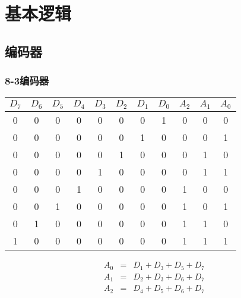 \documentclass[10pt]{book}
\begin{document}
\chapter{基本逻辑}
\section{编码器}
\subsection{8-3编码器}
\begin{tabular}{|c|c|c|c|c|c|c|c||c|c|c|}
\hline
$D_{7}$ & $D_{6}$ & $D_{5}$ & $D_{4}$ & $D_{3}$ & $D_{2}$ & $D_{1}$ & $D_{0}$ & $A_{2}$ & $A_{1}$ & $A_{0}$ \\
\hline
0 & 0 & 0 & 0 & 0 & 0 & 0 & 1 & 0 & 0 & 0 \\
0 & 0 & 0 & 0 & 0 & 0 & 1 & 0 & 0 & 0 & 1 \\
0 & 0 & 0 & 0 & 0 & 1 & 0 & 0 & 0 & 1 & 0 \\
0 & 0 & 0 & 0 & 1 & 0 & 0 & 0 & 0 & 1 & 1 \\
0 & 0 & 0 & 1 & 0 & 0 & 0 & 0 & 1 & 0 & 0 \\
0 & 0 & 1 & 0 & 0 & 0 & 0 & 0 & 1 & 0 & 1 \\
0 & 1 & 0 & 0 & 0 & 0 & 0 & 0 & 1 & 1 & 0 \\
1 & 0 & 0 & 0 & 0 & 0 & 0 & 0 & 1 & 1 & 1 \\
\hline
\end{tabular}

\begin{eqnarray}
A_{0} &=& D_{1}+D_{3}+D_{5}+D_{7} \\
A_{1} &=& D_{2}+D_{3}+D_{6}+D_{7} \\
A_{2} &=& D_{4}+D_{5}+D_{6}+D_{7}
\end{eqnarray}
\end{document}
